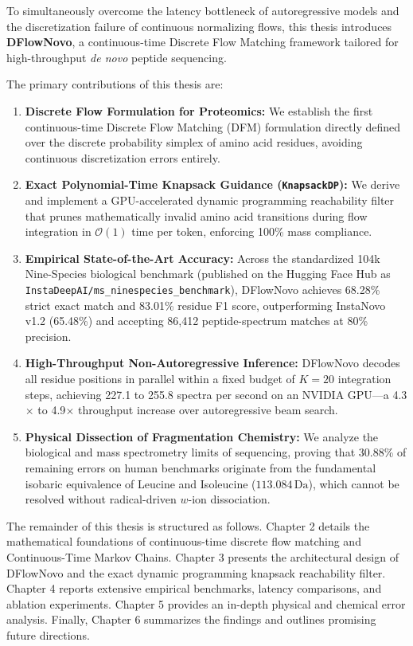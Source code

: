 To simultaneously overcome the latency bottleneck of autoregressive models and the discretization failure of continuous normalizing flows, this thesis introduces \textbf{DFlowNovo}, a continuous-time Discrete Flow Matching framework tailored for high-throughput \emph{de novo} peptide sequencing. 

The primary contributions of this thesis are:
\begin{enumerate}[(1)]
\item \textbf{Discrete Flow Formulation for Proteomics:} We establish the first continuous-time Discrete Flow Matching (DFM) formulation directly defined over the discrete probability simplex of amino acid residues, avoiding continuous discretization errors entirely.
\item \textbf{Exact Polynomial-Time Knapsack Guidance (\texttt{KnapsackDP}):} We derive and implement a GPU-accelerated dynamic programming reachability filter that prunes mathematically invalid amino acid transitions during flow integration in $\mathcal{O}(1)$ time per token, enforcing 100\% mass compliance.
\item \textbf{Empirical State-of-the-Art Accuracy:} Across the standardized 104k Nine-Species biological benchmark \citep{Tran2017} (published on the Hugging Face Hub as \texttt{InstaDeepAI/ms\_ninespecies\_benchmark}), DFlowNovo achieves 68.28\% strict exact match and 83.01\% residue F1 score, outperforming InstaNovo v1.2 (65.48\%) and accepting 86,412 peptide-spectrum matches at 80\% precision.
\item \textbf{High-Throughput Non-Autoregressive Inference:} DFlowNovo decodes all residue positions in parallel within a fixed budget of $K=20$ integration steps, achieving 227.1 to 255.8 spectra per second on an NVIDIA GPU---a 4.3$\times$ to 4.9$\times$ throughput increase over autoregressive beam search.
\item \textbf{Physical Dissection of Fragmentation Chemistry:} We analyze the biological and mass spectrometry limits of sequencing, proving that 30.88\% of remaining errors on human benchmarks originate from the fundamental isobaric equivalence of Leucine and Isoleucine ($113.084\,\text{Da}$), which cannot be resolved without radical-driven $w$-ion dissociation.
\end{enumerate}

The remainder of this thesis is structured as follows. Chapter 2 details the mathematical foundations of continuous-time discrete flow matching and Continuous-Time Markov Chains. Chapter 3 presents the architectural design of DFlowNovo and the exact dynamic programming knapsack reachability filter. Chapter 4 reports extensive empirical benchmarks, latency comparisons, and ablation experiments. Chapter 5 provides an in-depth physical and chemical error analysis. Finally, Chapter 6 summarizes the findings and outlines promising future directions.
